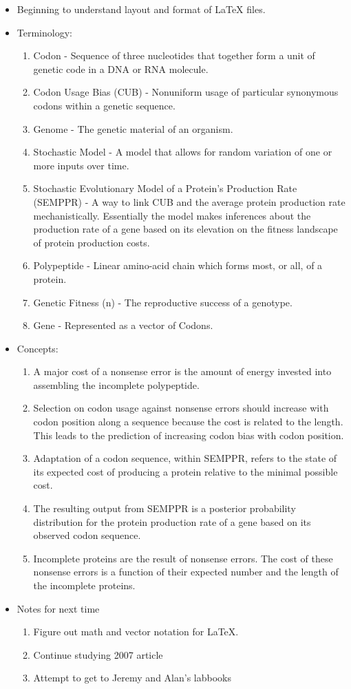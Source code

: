 \documentclass[letterpaper,index=totoc,hyperref,openany]{labbook} %
\begin{document}
\begin{itemize}
	\item Beginning to understand layout and format of LaTeX files.
	\item Terminology:
	\begin{enumerate}
		\item Codon - Sequence of three nucleotides that together form a unit of genetic code in a DNA or RNA molecule.
		\item Codon Usage Bias (CUB) - Nonuniform usage of particular synonymous codons within a genetic sequence. 
		\item Genome - The genetic material of an organism. 
		\item Stochastic Model - A model that allows for random variation of one or more inputs over time. 
		\item Stochastic Evolutionary Model of a Protein's Production Rate (SEMPPR) - A way to link CUB and the average protein production rate mechanistically. Essentially the model makes inferences about the production rate of a gene based on its elevation on the fitness landscape of protein production costs. 
		\item Polypeptide - Linear amino-acid chain which forms most, or all, of a protein.
		\item Genetic Fitness (n) - The reproductive success of a genotype.
		\item Gene - Represented as a vector of Codons.
	\end{enumerate}
	\item Concepts:
	\begin{enumerate}
		\item A major cost of a nonsense error is the amount of energy invested into assembling the incomplete polypeptide. 
		\item Selection on codon usage against nonsense errors should increase with codon position along a sequence because the cost is related to the length. This leads to the prediction of increasing codon bias with codon position.
		\item Adaptation of a codon sequence, within SEMPPR, refers to the state of its expected cost of producing a protein relative to the minimal possible cost.
		\item The resulting output from SEMPPR is a posterior probability distribution for the protein production rate of a gene based on its observed codon sequence.
		\item Incomplete proteins are the result of nonsense errors. The cost of these nonsense errors is a function of their expected number and the length of the incomplete proteins. 
	\end{enumerate}
	\item Notes for next time
	\begin{enumerate}
		\item Figure out math and vector notation for LaTeX.
		\item Continue studying 2007 article
		\item Attempt to get to Jeremy and Alan's labbooks
	\end{enumerate}
\end{itemize}
\end{document}
